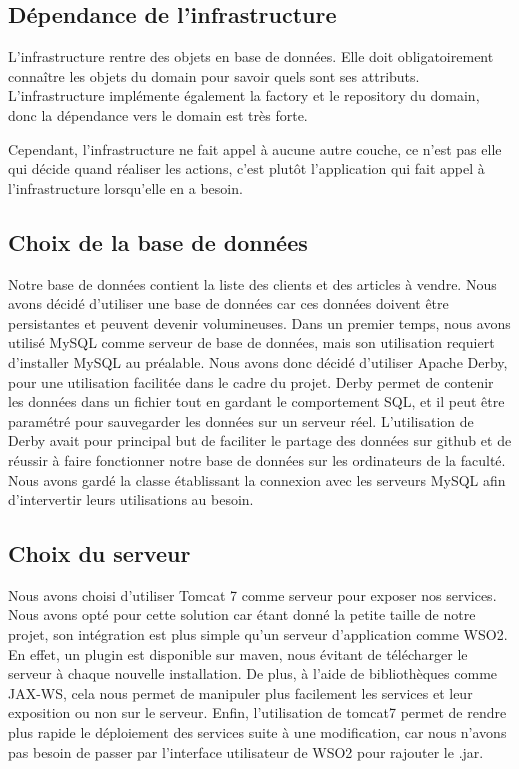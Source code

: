 \documentclass[a4paper]{article}
\begin{document}
\subsection{Dépendance de l'infrastructure} 
    L'infrastructure rentre des objets en base de données. Elle doit obligatoirement connaître les objets du domain pour savoir quels sont ses attributs. L'infrastructure implémente également la factory et le repository du domain, donc la dépendance vers le domain est très forte.
    
    \bigskip
    
    Cependant, l'infrastructure ne fait appel à aucune autre couche, ce n'est pas elle qui décide quand réaliser les actions, c'est plutôt l'application qui fait appel à l'infrastructure lorsqu'elle en a besoin.
    
\subsection{Choix de la base de données}
    Notre base de données contient la liste des clients et des articles à vendre. Nous avons décidé d'utiliser une base de données car ces données doivent être persistantes et peuvent devenir volumineuses. Dans un premier temps, nous avons utilisé MySQL comme serveur de base de données, mais son utilisation requiert d'installer MySQL au préalable. Nous avons donc décidé d'utiliser Apache Derby, pour une utilisation facilitée dans le cadre du projet. Derby permet de contenir les données dans un fichier tout en gardant le comportement SQL, et il peut être paramétré pour sauvegarder les données sur un serveur réel. L'utilisation de Derby avait pour principal but de faciliter le partage des données sur github et de réussir à faire fonctionner notre base de données sur les ordinateurs de la faculté. Nous avons gardé la classe établissant la connexion avec les serveurs MySQL afin d'intervertir leurs utilisations au besoin.

\subsection{Choix du serveur}\label{sec:choix}
    Nous avons choisi d'utiliser Tomcat 7 comme serveur pour exposer nos services. Nous avons opté pour cette solution car étant donné la petite taille de notre projet, son intégration est plus simple qu'un serveur d'application comme WSO2. En effet, un plugin est disponible sur maven, nous évitant de télécharger le serveur à chaque nouvelle installation. De plus, à l'aide de bibliothèques comme JAX-WS, cela nous permet de manipuler plus facilement les services et leur exposition ou non sur le serveur. Enfin, l'utilisation de tomcat7 permet de rendre plus rapide le déploiement des services suite à une modification, car nous n'avons pas besoin de passer par l'interface utilisateur de WSO2 pour rajouter le .jar.
\end{document}
